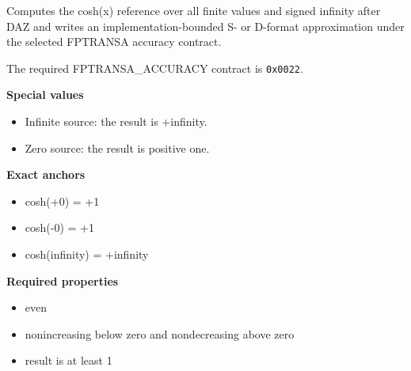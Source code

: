 Computes the cosh(x) reference over all finite values and signed infinity after DAZ and writes an implementation-bounded S- or D-format approximation under the selected FPTRANSA accuracy contract.

The required FPTRANSA\_ACCURACY contract is \texttt{0x0022}.

\textbf{Special values}\par
\begin{itemize}
\item Infinite source: the result is +infinity.
\item Zero source: the result is positive one.
\end{itemize}

\textbf{Exact anchors}\par
\begin{itemize}
\item cosh(+0) = +1
\item cosh(-0) = +1
\item cosh(infinity) = +infinity
\end{itemize}

\textbf{Required properties}\par
\begin{itemize}
\item even
\item nonincreasing below zero and nondecreasing above zero
\item result is at least 1
\end{itemize}
